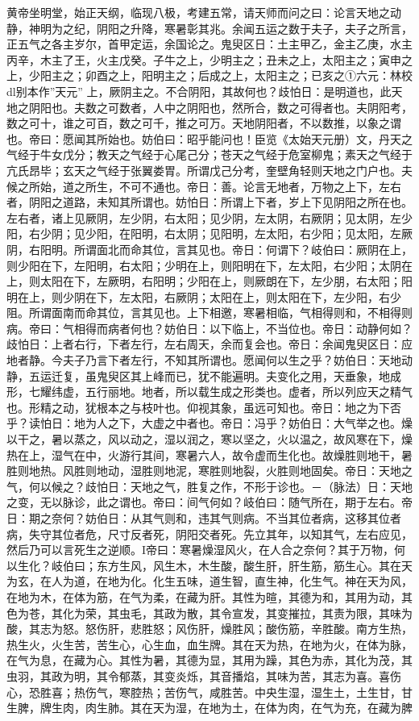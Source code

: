 \documentclass[a4paper,12pt,UTF8,twoside]{ctexbook}
\begin{document}
黄帝坐明堂，始正天纲，临现八极，考建五常，请天师而问之曰：论言天地之动静，神明为之纪，阴阳之升降，寒暑彰其兆。余闻五运之数于夫子，夫子之所言，正五气之各主岁尔，首甲定运，余国论之。鬼臾区日：土主甲乙，金主乙庚，水主丙辛，木主了王，火主戊癸。子牛之上，少明主之；丑未之上，太阳主之；寅申之上，少阳主之；卯酉之上，阳明主之；后成之上，太阳主之；已亥之①六元：林校dl别本作”天元”
上，厥阴主之。不合阴阳，其故何也？歧怕日：是明道也，此天地之阴阳也。夫数之可数者，人中之阴阳也，然所合，数之可得者也。夫阴阳考，数之可十，谁之可百，数之可千，推之可万。天地阴阳者，不以数推，以象之谓也。帝曰：愿闻其所始也。妨伯曰：昭乎能问也！臣览《太始天元册）文，丹天之气经于牛女戊分；教天之气经于心尾己分；苍天之气经于危室柳鬼；素天之气经于亢氏昂毕；玄天之气经于张翼娄胃。所谓戊己分考，奎壁角轻则天地之门户也。夫候之所始，道之所生，不可不通也。帝日：善。论言无地者，万物之上下，左右者，阴阳之道路，未知其所谓也。妨怕日：所谓上下者，岁上下见阴阳之所在也。左右者，诸上见厥阴，左少阴，右太阳；见少阴，左太阴，右厥阴；见太阴，左少阳，右少阴；见少阳，在阳明，右太阴；见阳明，左太阳，右少阳；见太阳，左厥阴，右阳明。所谓面北而命其位，言其见也。帝日：何谓下？岐伯曰：厥阴在上，则少阳在下，左阳明，右太阳；少明在上，则阳明在下，左太阳，右少阳；太阴在上，则太阳在下，左厥明，右阳明；少阳在上，则厥朗在下，左少朋，右太阳；阳明在上，则少阴在下，左太阳，右厥阴；太阳在上，则太阳在下，左少阳，右少阻。所谓面南而命其位，言其见也。上下相邀，寒暑相临，气相得则和，不相得则病。帝曰：气相得而病者何也？妨伯日：以下临上，不当位也。帝日：动静何如？歧怕日：上者右行，下者左行，左右周天，余而复会也。帝日：余闻鬼臾区日：应地者静。今夫子乃言下者左行，不知其所谓也。愿闻何以生之乎？妨伯日：天地动静，五运迁复，虽鬼臾区其上峰而已，犹不能遍明。夫变化之用，天垂象，地成形，七耀纬虚，五行丽地。地者，所以载生成之形类也。虚者，所以列应天之精气也。形精之动，犹根本之与枝叶也。仰视其象，虽远可知也。帝日：地之为下否乎？读怕日：地为人之下，大虚之中者也。帝日：冯乎？妨伯日：大气举之也。燥以干之，暑以蒸之，风以动之，湿以润之，寒以坚之，火以温之，故风寒在下，燥热在上，湿气在中，火游行其间，寒暑六人，故令虚而生化也。故燥胜则地干，暑胜则地热。风胜则地动，湿胜则地泥，寒胜则地裂，火胜则地固矣。帝日：天地之气，何以候之？歧怕日：天地之气，胜复之作，不形于诊也。－（脉法）日：天地之变，无以脉诊，此之谓也。帝曰：间气何如？岐伯曰：随气所在，期于左右。帝日：期之奈何？妨伯日：从其气则和，违其气则病。不当其位者病，这移其位者病，失守其位者危，尺寸反者死，阴阳交者死。先立其年，以知其气，左右应见，然后乃可以言死生之逆顺。I帝曰：寒暑燥湿风火，在人合之奈何？其于万物，何以生化？岐伯曰；东方生风，风生木，木生酸，酸生肝，肝生筋，筋生心。其在天为玄，在人为道，在地为化。化生五味，道生智，直生神，化生气。神在天为风，在地为木，在体为筋，在气为柔，在藏为肝。其性为暄，其德为和，其用为动，其色为苍，其化为荣，其虫毛，其政为散，其令宣发，其变摧拉，其责为限，其味为酸，其志为怒。怒伤肝，悲胜怒；风伤肝，燥胜风；酸伤筋，辛胜酸。南方生热，热生火，火生苦，苦生心，心生血，血生牌。其在天为热，在地为火，在体为脉，在气为息，在藏为心。其性为暑，其德为显，其用为躁，其色为赤，其化为茂，其虫羽，其政为明，其令郁蒸，其变炎烁，其音播焰，其味为苦，其志为喜。喜伤心，恐胜喜；热伤气，寒腔热；苦伤气，咸胜苦。中央生湿，湿生土，土生甘，甘生脾，牌生肉，肉生肺。其在天为湿，在地为土，在体为肉，在气为充，在藏为脾
\end{document}

